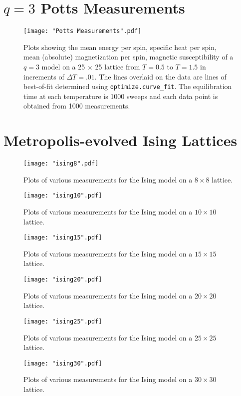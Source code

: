 \documentclass[twocolumn,aps]{revtex4-1} %
\begin{document}
\appendix

\section{$q = 3$ Potts Measurements}
\begin{figure*}[b]
	\texttt{[image: "Potts Measurements".pdf]}
	\caption{\label{fig:q3potts}Plots showing the mean energy per spin, specific heat per spin, mean (absolute) magnetization per spin, magnetic susceptibility of a $q=3$ model on a 25 $\times$ 25 lattice from $T = 0.5$ to $T = 1.5$ in increments of $\Delta T = .01$. The lines overlaid on the data are lines of best-of-fit determined using \texttt{optimize.curve\_fit}. The equilibration time at each temperature is 1000 sweeps and each data point is obtained from 1000 measurements.}
\end{figure*}
\clearpage
\section{Metropolis-evolved Ising Lattices}
\begin{figure*}
	\texttt{[image: "ising8".pdf]}
	\caption{\label{fig:ising8} Plots of various measurements for the Ising model on a $8 \times 8 $ lattice.}
\end{figure*}
\begin{figure*}
	\texttt{[image: "ising10".pdf]}
	\caption{\label{fig:ising10} Plots of various measurements for the Ising model on a $10 \times 10 $ lattice.}
\end{figure*}
\begin{figure*}
	\texttt{[image: "ising15".pdf]}
	\caption{\label{fig:ising15} Plots of various measurements for the Ising model on a $15 \times 15 $ lattice.}
\end{figure*}
\begin{figure*}
	\texttt{[image: "ising20".pdf]}
	\caption{\label{fig:ising20} Plots of various measurements for the Ising model on a $20 \times 20 $ lattice.}
\end{figure*}
\begin{figure*}
	\texttt{[image: "ising25".pdf]}
	\caption{\label{fig:ising25} Plots of various measurements for the Ising model on a $25 \times 25 $ lattice.}
\end{figure*}
\begin{figure*}
	\texttt{[image: "ising30".pdf]}
	\caption{\label{fig:ising30} Plots of various measurements for the Ising model on a $30 \times 30 $ lattice.}
\end{figure*}
\clearpage
\end{document}
